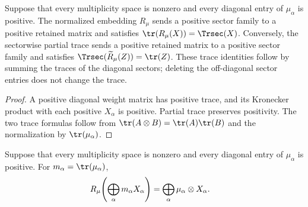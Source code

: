 \begin{lemma}
    \label{lem:mpdo_normalized_vertical_sector_positive_trace}
    \leanok
    Suppose that every multiplicity space is nonzero and every diagonal entry
    of $\mu_\alpha$ is positive. The normalized embedding $R_\mu$ sends a
    positive sector family to a positive retained matrix and satisfies
    $\tr(R_\mu(X))=\Trsec(X)$.
    Conversely, the sectorwise partial trace sends a positive retained matrix
    to a positive sector family and satisfies
    $\Trsec(\widetilde R_\mu(Z))=\tr(Z)$.
    These trace identities follow by summing the traces of the diagonal
    sectors; deleting the off-diagonal sector entries does not change the
    trace.
\end{lemma}

\begin{proof}\leanok
    A positive diagonal weight matrix has positive trace, and its Kronecker
    product with each positive $X_\alpha$ is positive. Partial trace preserves
    positivity. The two trace formulas follow from
    $\tr(A\otimes B)=\tr(A)\tr(B)$
    and the normalization by $\tr(\mu_\alpha)$.
\end{proof}

\begin{lemma}
    \label{lem:mpdo_normalized_retained_vertical_sector_embedding}
    \leanok
    Suppose that every multiplicity space is nonzero and every diagonal entry
    of $\mu_\alpha$ is positive. For $m_\alpha=\tr(\mu_\alpha)$,
    \begin{align}
        R_\mu\!\left(\bigoplus_\alpha m_\alpha X_\alpha\right)
         & =\bigoplus_\alpha\mu_\alpha\otimes X_\alpha.
        \notag
    \end{align}
\end{lemma}

